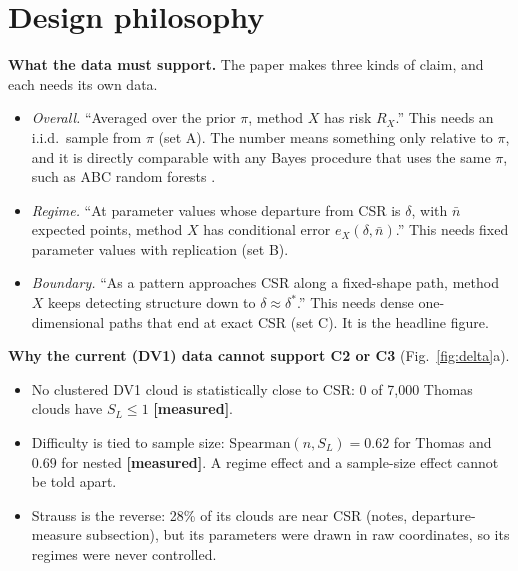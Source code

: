 \documentclass[10pt,a4paper]{article}
\newcommand{\measured}{\textcolor{green!45!black}{\textbf{[measured]}}}
\newcommand{\nbar}{\bar n}
\begin{document}
\section{Design philosophy}\label{sec:philosophy}

\textbf{What the data must support.} The paper makes three kinds of claim, and each needs its own data.
\begin{itemize}
  \item[(C1)] \emph{Overall.} ``Averaged over the prior $\pi$, method $X$ has risk $R_X$.'' This needs an i.i.d.\ sample from $\pi$ (set A). The number means something only relative to $\pi$, and it is directly comparable with any Bayes procedure that uses the same $\pi$, such as ABC random forests \citep{Raynal2019}.
  \item[(C2)] \emph{Regime.} ``At parameter values whose departure from CSR is $\delta$, with $\nbar$ expected points, method $X$ has conditional error $e_X(\delta,\nbar)$.'' This needs fixed parameter values with replication (set B).
  \item[(C3)] \emph{Boundary.} ``As a pattern approaches CSR along a fixed-shape path, method $X$ keeps detecting structure down to $\delta\approx\delta^\ast$.'' This needs dense one-dimensional paths that end at exact CSR (set C). It is the headline figure.
\end{itemize}

\textbf{Why the current (DV1) data cannot support C2 or C3} (Fig.~\ref{fig:delta}a).
\begin{itemize}
  \item No clustered DV1 cloud is statistically close to CSR: 0 of 7{,}000 Thomas clouds have $S_L\le1$ \measured.
  \item Difficulty is tied to sample size: Spearman$(n,S_L)=0.62$ for Thomas and $0.69$ for nested \measured. A regime effect and a sample-size effect cannot be told apart.
  \item Strauss is the reverse: 28\% of its clouds are near CSR (notes, departure-measure subsection), but its parameters were drawn in raw coordinates, so its regimes were never controlled.
\end{itemize}
\end{document}
